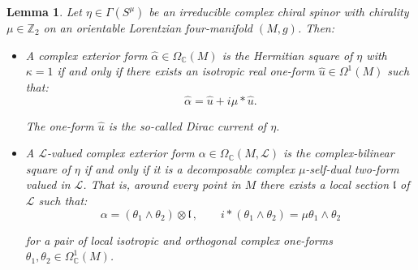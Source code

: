 \documentclass[10pt,a4paper,twoside,reqno]{amsart}
\theoremstyle{plain}
\newtheorem{lemma}[thm]{Lemma}
\theoremstyle{definition}
\theoremstyle{remark}
\def\Z{\mathbb{Z}}
\def\C{\mathbb{C}}
\def\cL{\mathcal{L}}
\begin{document}
\begin{lemma}
\label{lemma:squareslorentzian}
Let $\eta \in \Gamma(S^{\mu})$ be an irreducible complex chiral spinor with chirality $\mu\in\Z_2$ on an orientable Lorentzian four-manifold $(M,g)$. Then:
\begin{itemize}
    \item A complex exterior form $\widehat{\alpha} \in \Omega_\C(M)$ is the Hermitian square of $\eta$ with $\kappa=1$ if and only if there exists an isotropic real one-form $\widehat{u}\in \Omega^1(M)$ such that:
    \begin{equation*}
    \widehat{\alpha} = \widehat{u} + i\mu \ast \widehat{u}.
    \end{equation*}

    \noindent
    The one-form $\widehat{u}$ is the so-called \emph{Dirac current} of $\eta$.
    \item A $\cL$-valued complex exterior form $\alpha \in \Omega_\C(M,\cL)$ is the complex-bilinear square of $\eta$ if and only if it is a decomposable complex $\mu$-self-dual two-form valued in $\cL$. That is, around every point in $M$ there exists a local section $\mathfrak{l}$ of $\cL$ such that:
    \begin{equation*}
    \alpha = (\theta_1\wedge \theta_2) \otimes \mathfrak{l} \, , \qquad i\ast (\theta_1\wedge \theta_2 ) = \mu \theta_1\wedge \theta_2
    \end{equation*} 

    \noindent
    for a pair of local isotropic and orthogonal complex one-forms $\theta_1 , \theta_2 \in \Omega^1_\C(M)$.
\end{itemize}
\end{lemma}
\end{document}
